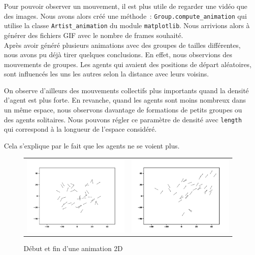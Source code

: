 \documentclass[french, a4paper, 12pt, openany]{report}
\begin{document}
   Pour pouvoir observer un mouvement, il est plus utile de regarder une vidéo que des images. Nous avons alors créé une méthode~: \verb|Group.compute_animation| qui utilise la classe \verb|Artist_animation| du module \verb|matplotlib|. Nous arrivions alors à générer des fichiers GIF avec le nombre de frames souhaité.\\
   
   Après avoir généré plusieurs animations avec des groupes de tailles différentes, nous avons pu déjà tirer quelques conclusions. En effet, nous observions des mouvements de groupes. Les agents qui avaient des positions de départ aléatoires, sont influencés les uns les autres selon la distance avec leurs voisins.
   
   On observe d'ailleurs des mouvements collectifs plus importants quand la densité d'agent est plus forte. En revanche, quand les agents sont moins nombreux dans un même espace, nous observons davantage de formations de petits groupes ou des agents solitaires. Nous pouvons régler ce paramètre de densité avec \verb|length| qui correspond à la longueur de l'espace considéré.
   
   Cela s'explique par le fait que les agents ne se voient plus.
	\begin{figure}[!h]
		\centering
		\begin{tabular}{cc}
			\includegraphics[width=8cm]{images/image_3.png} & \includegraphics[width=8cm]{images/image_4.png} \\
		\end{tabular}
		\caption{Début et fin d'une animation 2D}
	\end{figure} 
\end{document}
